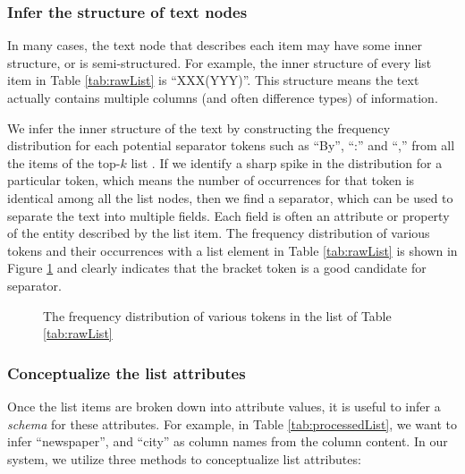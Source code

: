 \subsubsection{Infer the structure of text nodes}
In many cases, the text node that describes each item may have some inner
structure, or is semi-structured.  For example, the inner structure of
every list item in Table \ref{tab:rawList} is ``XXX(YYY)''. This structure
means the text actually contains multiple columns (and often difference types) 
of information.

We infer the inner structure of the text by constructing the frequency
distribution for each potential separator tokens such as ``By'', ``:'' and
``,'' from all the items of the top-$k$
list \cite{Fisher08:dirttoshovels}.
If we identify a sharp spike in the distribution for a
particular token, which means the number of occurrences for that token
is identical among all the list nodes, then we find a separator,
which can be used to separate the text into multiple fields. Each field
is often an attribute or property of the entity described by the list item.
The frequency distribution of various tokens and their occurrences
with a list element in Table \ref{tab:rawList} is shown
in Figure \ref{fig:histogram}
and clearly indicates that the bracket token is a good candidate for
separator.

\begin{figure}[th]
\centering
{}
\caption{The frequency distribution of various tokens in the list of Table \ref{tab:rawList}}
\label{fig:histogram}
\end{figure}


\subsubsection{Conceptualize the list attributes}
Once the list items are broken down into attribute values, it is useful
to infer a {\em schema} for these attributes.
For example, in Table \ref{tab:processedList}, we want to
infer ``newspaper'', and ``city'' as column names from the column
content. In our system, we utilize three methods to conceptualize list
attributes:


